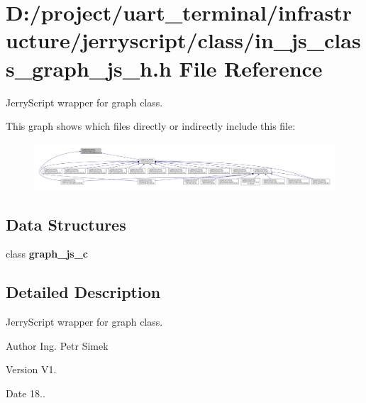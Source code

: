 \section{D\+:/project/uart\+\_\+terminal/infrastructure/jerryscript/class/in\+\_\+js\+\_\+class\+\_\+graph\+\_\+js\+\_\+h.h File Reference}
\label{in__js__class__graph__js__h_8h}


Jerry\+Script wrapper for graph class.  


This graph shows which files directly or indirectly include this file\+:
\nopagebreak
\begin{figure}[H]
\begin{center}
\leavevmode
\includegraphics[width=350pt]{in__js__class__graph__js__h_8h__dep__incl}
\end{center}
\end{figure}
\subsection*{Data Structures}
\begin{DoxyCompactItemize}
\item 
class \textbf{ graph\+\_\+js\+\_\+c}
\end{DoxyCompactItemize}


\subsection{Detailed Description}
Jerry\+Script wrapper for graph class. 

\begin{DoxyAuthor}{Author}
Ing. Petr Simek 
\end{DoxyAuthor}
\begin{DoxyVersion}{Version}
V1. 
\end{DoxyVersion}
\begin{DoxyDate}{Date}
18.. 
\end{DoxyDate}
